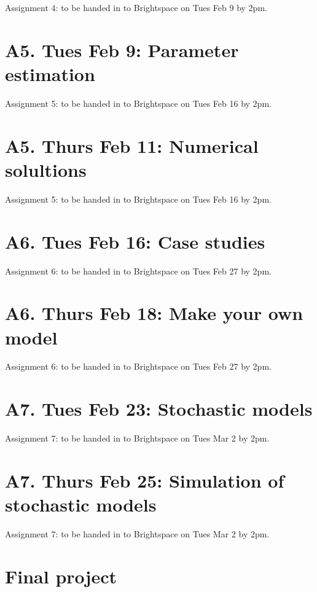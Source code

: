 \documentclass[]{book}
\begin{document}
Assignment 4: to be handed in to Brightspace on Tues Feb 9 by 2pm.

\chapter{A5. Tues Feb 9: Parameter
estimation}\label{a5.-tues-feb-9-parameter-estimation}

Assignment 5: to be handed in to Brightspace on Tues Feb 16 by 2pm.

\chapter{A5. Thurs Feb 11: Numerical
solultions}\label{a5.-thurs-feb-11-numerical-solultions}

Assignment 5: to be handed in to Brightspace on Tues Feb 16 by 2pm.

\chapter{A6. Tues Feb 16: Case
studies}\label{a6.-tues-feb-16-case-studies}

Assignment 6: to be handed in to Brightspace on Tues Feb 27 by 2pm.

\chapter{A6. Thurs Feb 18: Make your own
model}\label{a6.-thurs-feb-18-make-your-own-model}

Assignment 6: to be handed in to Brightspace on Tues Feb 27 by 2pm.

\chapter{A7. Tues Feb 23: Stochastic
models}\label{a7.-tues-feb-23-stochastic-models}

Assignment 7: to be handed in to Brightspace on Tues Mar 2 by 2pm.

\chapter{A7. Thurs Feb 25: Simulation of stochastic
models}\label{a7.-thurs-feb-25-simulation-of-stochastic-models}

Assignment 7: to be handed in to Brightspace on Tues Mar 2 by 2pm.

\chapter{Final project}\label{final-project}
\end{document}
